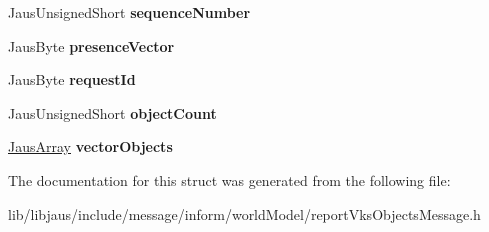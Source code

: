 \begin{DoxyCompactItemize}
\item 
\hypertarget{struct_report_vks_objects_message_struct_a5a6966699001219ac6f24652bf6a48a8}{\-Jaus\-Unsigned\-Short {\bfseries sequence\-Number}}\label{struct_report_vks_objects_message_struct_a5a6966699001219ac6f24652bf6a48a8}

\item 
\hypertarget{struct_report_vks_objects_message_struct_ab5e3bdb0f67c2ee5fe7ef04a4ef36e3c}{\-Jaus\-Byte {\bfseries presence\-Vector}}\label{struct_report_vks_objects_message_struct_ab5e3bdb0f67c2ee5fe7ef04a4ef36e3c}

\item 
\hypertarget{struct_report_vks_objects_message_struct_a1c7a5994bc02e09d41237e9c8cfc39db}{\-Jaus\-Byte {\bfseries request\-Id}}\label{struct_report_vks_objects_message_struct_a1c7a5994bc02e09d41237e9c8cfc39db}

\item 
\hypertarget{struct_report_vks_objects_message_struct_aeaf8e983072b6b6130bf6bcf2705d8a1}{\-Jaus\-Unsigned\-Short {\bfseries object\-Count}}\label{struct_report_vks_objects_message_struct_aeaf8e983072b6b6130bf6bcf2705d8a1}

\item 
\hypertarget{struct_report_vks_objects_message_struct_a6d85cbe7f440405340cee56df13fa0f3}{\hyperlink{struct_jaus_array_struct}{\-Jaus\-Array} {\bfseries vector\-Objects}}\label{struct_report_vks_objects_message_struct_a6d85cbe7f440405340cee56df13fa0f3}

\end{DoxyCompactItemize}


\-The documentation for this struct was generated from the following file\-:\begin{DoxyCompactItemize}
\item 
lib/libjaus/include/message/inform/world\-Model/report\-Vks\-Objects\-Message.\-h\end{DoxyCompactItemize}
